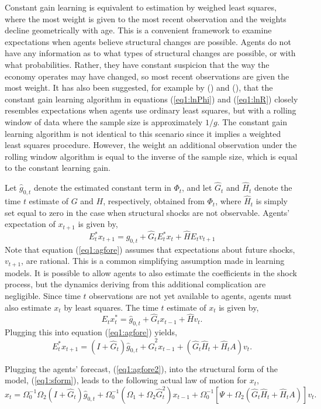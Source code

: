 \documentclass[11pt]{article}
\newcommand{\beq}{\begin{equation}}
\newcommand{\eeq}{\end{equation}}
\newcommand{\citee}[1]{\citeauthor*{#1} (\citeyear{#1})}
\newcommand{\h}[1]{\hat{#1}}
\begin{document}
Constant gain learning is equivalent to estimation by weighed least squares, where the most weight is given to the most recent observation and the weights decline geometrically with age.  This is a convenient framework to examine expectations when agents believe structural changes are possible.  Agents do not have any information as to what types of structural changes are possible, or with what probabilities.  Rather, they have constant suspicion that the way the economy operates may have changed, so most recent observations are given the most weight.  It has also been suggested, for example by \citee{evanshonka2001} and \citee{sargent1999}, that the constant gain learning algorithm in equations (\ref{eq1:lnPhi}) and (\ref{eq1:lnR}) closely resembles expectations when agents use ordinary least squares, but with a rolling window of data where the sample size is approximately $1/g$.  The constant gain learning algorithm is not identical to this scenario since it implies a weighted least squares procedure.  However, the weight an additional observation under the rolling window algorithm is equal to the inverse of the sample size, which is equal to the constant learning gain.  

Let $\h{g}_{0,t}$ denote the estimated constant term in $\Phi_t$, and let $\h{G}_t$ and $\h{H}_t$ denote the time $t$ estimate of $G$ and $H$, respectively, obtained from $\Phi_t$, where $\h{H}_t$ is simply set equal to zero in the case when structural shocks are not observable.  Agents' expectation of $x_{t+1}$ is given by, 
\beq \label{eq1:agfore} E_t^* x_{t+1} = \h{g}_{0,t} + \h{G}_t E_t^* x_t + \h{H} E_t v_{t+1} \eeq
Note that equation (\ref{eq1:agfore}) assumes that expectations about future shocks, $v_{t+1}$, are rational.  This is a common simplifying assumption made in learning models.  It is possible to allow agents to also estimate the coefficients in the shock process, but the dynamics deriving from this additional complication are negligible.  Since time $t$ observations are not yet available to agents, agents must also estimate $x_t$ by least squares.  The time $t$ estimate of $x_t$ is given by,
\beq \label{eq1:agfore1} E_t x_t^* = \h{g}_{0,t} + \h{G}_t x_{t-1} + \h{H} v_t. \eeq
Plugging this into equation (\ref{eq1:agfore}) yields,
\beq \label{eq1:agfore2} E_t^* x_{t+1} = (I + \h{G}_t)\h{g}_{0,t} + \h{G}_t^2 x_{t-1} + \left(\h{G}_t \h{H}_t + \h{H}_t A \right) v_t. \eeq

Plugging the agents' forecast, (\ref{eq1:agfore2}), into the structural form of the model, (\ref{eq1:sform}), leads to the following actual law of motion for $x_t$,
\beq \label{eq1:alm} x_t = \Omega_0^{-1}\Omega_{2}\left(I+\h{G}_t\right)\h{g}_{0,t} + \Omega_0^{-1} \left(\Omega_{1} + \Omega_{2} \h{G}_t^2 \right) x_{t-1}  + \Omega_0^{-1} \left[ \Psi + \Omega_2 \left(\h{G}_t \h{H}_t + \h{H}_t A \right) \right] v_t. \eeq
\end{document}
